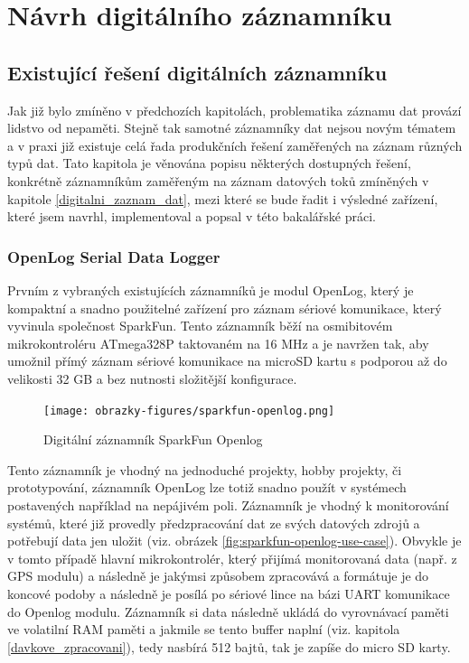 \chapter{Návrh digitálního záznamníku}


\section{Existující řešení digitálních záznamníku}
Jak již bylo zmíněno v předchozích kapitolách, problematika záznamu dat provází lidstvo od nepaměti. Stejně tak samotné záznamníky dat nejsou novým tématem a v praxi již existuje celá řada produkčních řešení zaměřených na záznam různých typů dat. Tato kapitola je věnována popisu některých dostupných řešení, konkrétně záznamníkům zaměřeným na záznam datových toků zmíněných v kapitole \ref{digitalni_zaznam_dat}, mezi které se bude řadit i výsledné zařízení, které jsem navrhl, implementoval a popsal v této bakalářské práci. 


\subsection{OpenLog Serial Data Logger}
\label{openlog_serial_datalogger_module}
Prvním z vybraných existujících záznamníků je modul OpenLog, který je kompaktní a snadno použitelné zařízení pro záznam sériové komunikace, který vyvinula společnost SparkFun. Tento záznamník běží na osmibitovém mikrokontroléru ATmega328P taktovaném na 16 MHz a je navržen tak, aby umožnil přímý záznam sériové komunikace na microSD kartu s podporou až do velikosti 32 GB a bez nutnosti složitější konfigurace. \cite{sparkfun_openlog_tutorial}

\begin{figure}[h]
    \centering
    \texttt{[image: obrazky-figures/sparkfun-openlog.png]}
    
    \caption{Digitální záznamník SparkFun Openlog \cite{cirkit_openlog}}
    \label{fig:sparkfun-openlog}
\end{figure}

Tento záznamník je vhodný na jednoduché projekty, hobby projekty, či prototypování, záznamník OpenLog lze totiž snadno použít v systémech postavených například na nepájivém poli. Záznamník je vhodný k monitorování systémů, které již provedly předzpracování dat ze svých datových zdrojů a potřebují data jen uložit (viz. obrázek \ref{fig:sparkfun-openlog-use-case}). Obvykle je v tomto případě hlavní mikrokontrolér, který přijímá monitorovaná data (např. z GPS modulu) a následně je jakýmsi způsobem zpracovává a formátuje je do koncové podoby a následně je posílá po sériové lince na bázi UART komunikace do Openlog modulu. Záznamník si data následně ukládá do vyrovnávací paměti ve volatilní RAM paměti a jakmile se tento buffer naplní (viz. kapitola \ref{davkove_zpracovani}), tedy nasbírá 512 bajtů, tak je zapíše do micro SD karty. \cite{cirkit_openlog}

